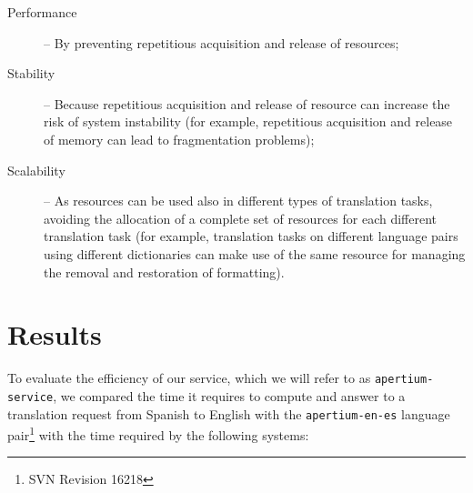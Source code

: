 \documentclass[11pt]{article}
\begin{document}
\begin{description}
 \item[Performance] -- By preventing repetitious acquisition and release of resources;
 \item[Stability] -- Because repetitious acquisition and release of resource can increase the risk of system instability (for example, repetitious acquisition and release of memory can lead to fragmentation problems); %




 \item[Scalability] -- As resources can be used also in different types of translation tasks, avoiding the allocation of a complete set of resources for each different translation task (for example, translation tasks on different language pairs using different dictionaries can make use of the same resource for managing the removal and restoration of formatting).
\end{description}

\section{Results}

To evaluate the efficiency of our service, which we will refer to as {\tt apertium-service}, we compared the time it requires to compute and answer to a translation request from Spanish to English with the {\tt\small apertium-en-es} language pair\footnote{SVN Revision 16218} with the time required by the following systems:

\end{document}
